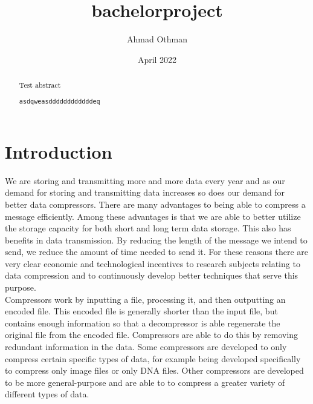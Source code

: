 \documentclass{article}
\title{bachelorproject}
\author{Ahmad Othman}
\date{April 2022}
\begin{document}
\maketitle

\newpage

\begin{abstract}
Test abstract

\verb|asdqweasddddddddddddeq|

\end{abstract}

\newpage

\tableofcontents

\newpage
\section{Introduction}


We are storing and transmitting more and more data every year and as our demand for storing and transmitting data increases so does our demand for better data compressors. %
There are many advantages to being able to compress a message efficiently. Among these advantages is that we are able to better utilize the storage capacity for both short and long term data storage. This also has benefits in data transmission. By reducing the length of the message we intend to send, we reduce the amount of time needed to send it.
For these reasons there are very clear economic and technological incentives to research subjects relating to data compression and to continuously develop better techniques that serve this purpose.
\\
Compressors work by inputting a file, processing it, and then outputting an encoded file. This encoded file is generally shorter than the input file, but contains enough information so that a decompressor is able regenerate the original file from the encoded file. Compressors are able to do this by removing redundant information in the data. %
Some compressors are developed to only compress certain specific types of data, for example being developed specifically to compress only image files or only DNA files. Other compressors are developed to be more general-purpose and are able to to compress a greater variety of different types of data.
\end{document}
